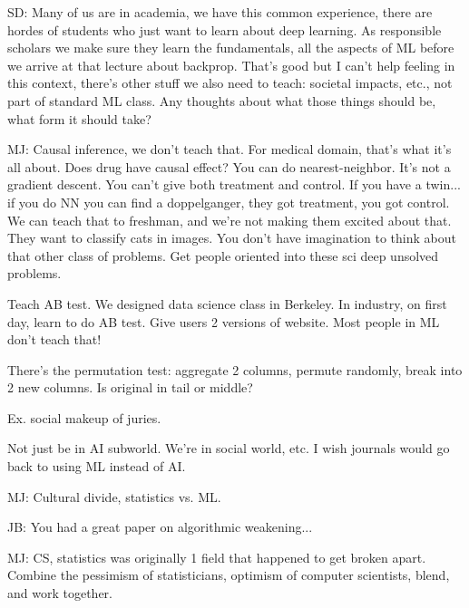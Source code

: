 SD: Many of us are in academia, we have this common experience, there are hordes of students who just want to learn about deep learning. As responsible scholars we make sure they learn the fundamentals, all the aspects of ML before we arrive at that lecture about backprop. That's good but I can't help feeling in this context, there's other stuff we also need to teach: societal impacts, etc., not part of standard ML class. 
Any thoughts about what those things should be, what form it should take?

MJ: Causal inference, we don't teach that. For medical domain, that's what it's all about. Does drug have causal effect? You can do nearest-neighbor. It's not a gradient descent. You can't give both treatment and control. If you have a twin... if you do NN you can find a doppelganger, they got treatment, you got control. We can teach that to freshman, and we're not making them excited about that. They want to classify cats in images.  You don't have imagination to think about that other class of problems. Get people oriented into these sci deep unsolved problems. 

Teach AB test. We designed data science class in Berkeley. In industry, on first day, learn to do AB test. Give users 2 versions of website. Most people in ML don't teach that! 

There's the permutation test: aggregate 2 columns, permute randomly, break into 2 new columns. Is original in tail or middle?

Ex. social makeup of juries. 

Not just be in AI subworld. We're in social world, etc.  I wish journals would go back to using ML instead of AI.

MJ: Cultural divide, statistics vs. ML.

JB: You had a great paper on algorithmic weakening...
 
MJ: CS, statistics was originally 1 field that happened to get broken apart.  Combine the pessimism of statisticians, optimism of computer scientists, blend, and work together. 